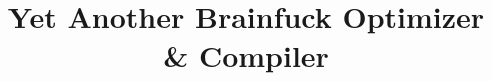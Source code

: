\documentclass[a4paper]{article}
\title{Yet Another Brainfuck Optimizer \& Compiler}
\begin{document}
\maketitle



\newpage
\printglossaries
\end{document}
